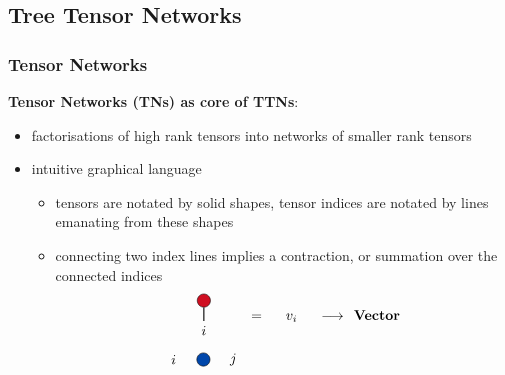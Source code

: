 \documentclass[xcolor=table,8pt]{beamer}
\begin{document}
    \subsection{Tree Tensor Networks}
    \begin{frame}[t]
        \frametitle{Tensor Networks}
        
        \textbf{Tensor Networks (TNs) as core of TTNs}:
        \begin{itemize}
            \item \alert{factorisations of high rank tensors into networks of smaller rank tensors}
            \item intuitive graphical language
            \begin{itemize}
                \item tensors are notated by solid shapes, tensor indices are notated by lines emanating from these shapes
                \item connecting two index lines implies a contraction, or summation over the connected indices
                \begin{equation}
                    \begin{array}{ c @{\extracolsep{0.25cm}} c c c @{\extracolsep{0.25cm}} c }
                        \begin{tikzpicture}[baseline={([yshift=-.5ex]current bounding box.center)}]
                            \node[draw, shape=circle, fill=lava] (n0) at (0,0)  {};
                            \node                     (i0) at (0,-0.75) {\( i \)};
                            \draw [thick] (n0) -- (i0);
                        \end{tikzpicture}
                        &=& v_{i} &\longrightarrow&   \textbf{Vector}
                        \\
                        \begin{tikzpicture}[baseline={([yshift=-.5ex]current bounding box.center)}]
                            \node[draw, shape=circle, fill=cobalt] (n0) at (0,0)  {};
                            \node                     (i0) at (-0.75,0) {\( i \)};
                            \node                     (i1) at ( 0.75,0) {\( j \)};
                            \node                     (e0) at ( 0   ,-0.375) {~};
                            \node                     (e1) at ( 0   , 0.375) {~};

\end{tikzpicture}
\end{array}
\end{equation}
\end{itemize}
\end{itemize}
\end{frame}
\end{document}
